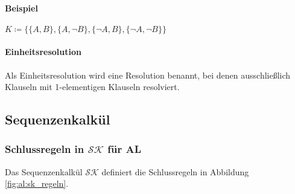 \documentclass[a4paper, 11pt, accentcolor = tud3b]{tudreport}
\begin{document}
                    \begin{algorithm}[H]

                         
                    \end{algorithm}

                \paragraph{Beispiel}
                    $ K \coloneqq \{ \{ A, B \}, \{ A, \lnot B \}, \{ \lnot A, B \}, \{ \lnot A, \lnot B \} \} $

                    \begin{figure}[ht]
                        \centering
                    \end{figure}

                \paragraph{Einheitsresolution}
                    Als Einheitsresolution wird eine Resolution benannt, bei denen ausschließlich Klauseln mit 1-elementigen Klauseln resolviert.

            \subsection{Sequenzenkalkül}
                \subsubsection{Schlussregeln in $ \mathcal{SK} $ für AL}
                    Das Sequenzenkalkül $ \mathcal{SK} $ definiert die Schlussregeln in Abbildung \ref{fig:al:sk_regeln}.
\end{document}
